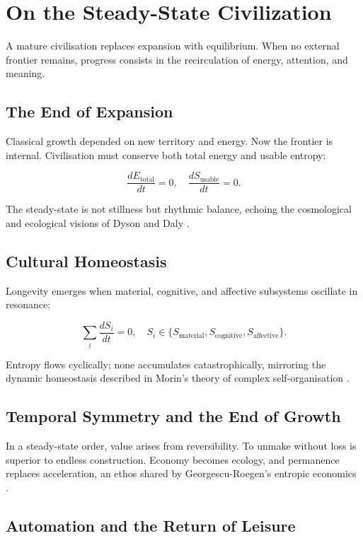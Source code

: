\documentclass[12pt,a4paper]{article}
\begin{document}
\section{On the Steady-State Civilization}

A mature civilisation replaces expansion with equilibrium.  
When no external frontier remains, progress consists in the 
recirculation of energy, attention, and meaning.

\subsection{The End of Expansion}

Classical growth depended on new territory and energy.
Now the frontier is internal.  
Civilisation must conserve both total energy and usable entropy:

\[
\frac{dE_{\text{total}}}{dt} = 0,
\quad
\frac{dS_{\text{usable}}}{dt} = 0.
\]

The steady-state is not stillness but rhythmic balance,
echoing the cosmological and ecological visions of Dyson \citep{dyson1979time}
and Daly \citep{daly2020rethinking}.

\subsection{Cultural Homeostasis}

Longevity emerges when material, cognitive, and affective subsystems oscillate in resonance:

\[
\sum_i \frac{dS_i}{dt} = 0,
\quad
S_i \in \{S_{\text{material}}, S_{\text{cognitive}}, S_{\text{affective}}\}.
\]

Entropy flows cyclically; none accumulates catastrophically,
mirroring the dynamic homeostasis described in 
Morin’s theory of complex self-organisation \citep{morin2008method}.

\subsection{Temporal Symmetry and the End of Growth}

In a steady-state order, value arises from reversibility.  
To unmake without loss is superior to endless construction.  
Economy becomes ecology, and permanence replaces acceleration,
an ethos shared by Georgescu-Roegen’s entropic economics 
\citep{georgescu1971entropy}.

\subsection{Automation and the Return of Leisure}
\end{document}
